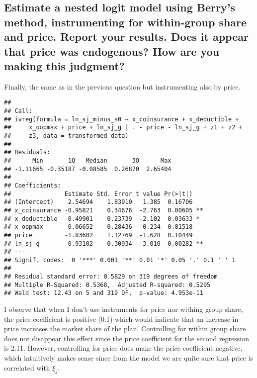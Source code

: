 \documentclass[]{article}
\begin{document}
\hypertarget{estimate-a-nested-logit-model-using-berrys-method-instrumenting-for-within-group-share-and-price.-report-your-results.-does-it-appear-that-price-was-endogenous-how-are-you-making-this-judgment}{%
\subsection{Estimate a nested logit model using Berry's method,
instrumenting for within-group share and price. Report your results.
Does it appear that price was endogenous? How are you making this
judgment?}\label{estimate-a-nested-logit-model-using-berrys-method-instrumenting-for-within-group-share-and-price.-report-your-results.-does-it-appear-that-price-was-endogenous-how-are-you-making-this-judgment}}

Finally, the same as in the previous question but instrumenting also by
price.

\begin{verbatim}
## 
## Call:
## ivreg(formula = ln_sj_minus_s0 ~ x_coinsurance + x_deductible + 
##     x_oopmax + price + ln_sj_g | . - price - ln_sj_g + z1 + z2 + 
##     z3, data = transformed_data)
## 
## Residuals:
##      Min       1Q   Median       3Q      Max 
## -1.11665 -0.35187 -0.08585  0.26870  2.65404 
## 
## Coefficients:
##               Estimate Std. Error t value Pr(>|t|)   
## (Intercept)    2.54694    1.83910   1.385  0.16706   
## x_coinsurance -0.95821    0.34676  -2.763  0.00605 **
## x_deductible  -0.49901    0.23739  -2.102  0.03633 * 
## x_oopmax       0.06652    0.28436   0.234  0.81518   
## price         -1.83602    1.12769  -1.628  0.10449   
## ln_sj_g        0.93102    0.30934   3.010  0.00282 **
## ---
## Signif. codes:  0 '***' 0.001 '**' 0.01 '*' 0.05 '.' 0.1 ' ' 1
## 
## Residual standard error: 0.5829 on 319 degrees of freedom
## Multiple R-Squared: 0.5368,  Adjusted R-squared: 0.5295 
## Wald test: 12.43 on 5 and 319 DF,  p-value: 4.953e-11
\end{verbatim}

I observe that when I don't use instruments for price nor withing group
share, the price coefficient is positive (0.1) which would indicate that
an increase in price increases the market share of the plan. Controlling
for within group share does not disappear this effect since the price
coefficient for the second regression is 2.11. However, controlling for
price does make the price coefficient negative, which intuitively makes
sense since from the model we are quite sure that price is correlated
with \(\xi_j\).
\end{document}

